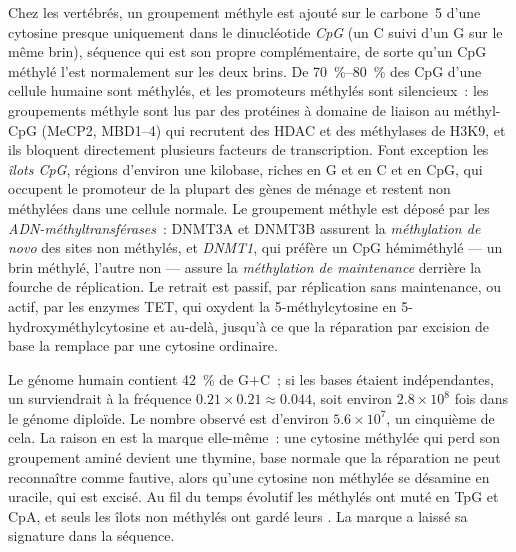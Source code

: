 \begin{definition}\label{def:b3:chromatin-epigenetics:methylation}
Chez les vertébrés, un groupement méthyle est ajouté sur le carbone~5
d'une cytosine presque uniquement dans le dinucléotide \emph{CpG} (un C
suivi d'un G sur le même brin), séquence qui est son propre
complémentaire, de sorte qu'un CpG méthylé l'est normalement sur les
deux brins. De \qtyrange{70}{80}{\%} des CpG d'une cellule humaine sont
méthylés, et les promoteurs méthylés sont silencieux~: les groupements
méthyle sont lus par des protéines à domaine de liaison au méthyl-CpG
(MeCP2, MBD1--4) qui recrutent des HDAC et des méthylases de H3K9, et
ils bloquent directement plusieurs facteurs de transcription. Font
exception les \emph{îlots CpG}, régions d'environ une kilobase, riches
en G et en C et en CpG, qui occupent le promoteur de la plupart des
gènes de ménage et restent non méthylées dans une cellule normale. Le
groupement méthyle est déposé par les \emph{ADN-méthyltransférases}~:
DNMT3A et DNMT3B assurent la \emph{méthylation de novo} des sites non
méthylés, et \emph{DNMT1}, qui préfère un CpG hémiméthylé --- un brin
méthylé, l'autre non --- assure la \emph{méthylation de maintenance}
derrière la fourche de réplication. Le retrait est passif, par
réplication sans maintenance, ou actif, par les enzymes TET, qui
oxydent la 5-méthylcytosine en 5-hydroxyméthylcytosine et au-delà,
jusqu'à ce que la réparation par excision de base la remplace par une
cytosine ordinaire.
\end{definition}

\begin{example}\label{ex:b3:chromatin-epigenetics:cpg-deficit}
Le génome humain contient \qty{42}{\%} de G$+$C~; si les bases étaient
indépendantes, un  surviendrait à la fréquence
$0.21\times 0.21 \approx 0.044$, soit environ $2.8\times 10^{8}$ fois
dans le génome diploïde. Le nombre observé est d'environ
$5.6\times 10^{7}$, un cinquième de cela. La raison en est la marque
elle-même~: une cytosine méthylée qui perd son groupement aminé devient
une thymine, base normale que la réparation ne peut reconnaître comme
fautive, alors qu'une cytosine non méthylée se désamine en uracile, qui
est excisé. Au fil du temps évolutif les  méthylés ont muté en TpG
et CpA, et seuls les îlots non méthylés ont gardé leurs . La marque
a laissé sa signature dans la séquence.
\end{example}

